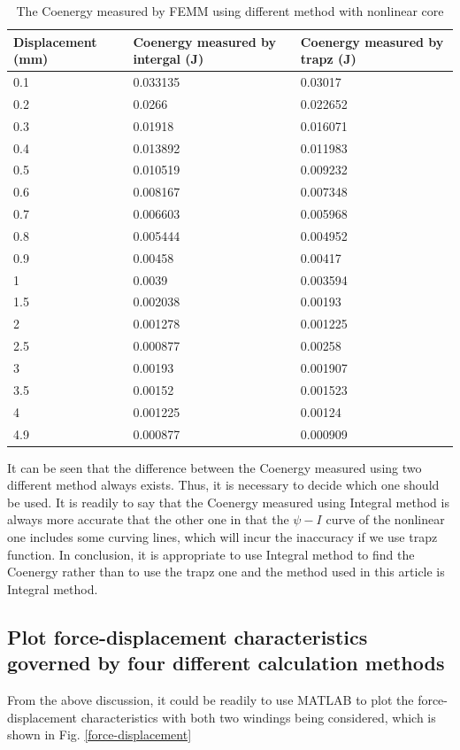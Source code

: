 \documentclass[a4paper]{IEEEtran}
\begin{document}
{\begin{table}[h!]
\centering
\begin{tabular}{|p{2.5cm}p{2.5cm}p{2.5cm}|} 
	\hline
	Displacement (mm) & Coenergy measured by intergal (J)& Coenergy measured by trapz (J)\\  
	\hline\hline
	0.1	& 0.033135 & 0.03017\\
	\hline
	0.2	& 0.0266 &0.022652\\
	\hline
	0.3	& 0.01918 & 0.016071\\
	\hline
	0.4	& 0.013892 & 0.011983\\
	\hline
	0.5	& 0.010519 & 0.009232\\
	\hline
	0.6	& 0.008167 & 0.007348\\
	\hline
	0.7	& 0.006603 & 0.005968\\
	\hline
	0.8	& 0.005444 & 0.004952\\
	\hline
	0.9	& 0.00458 & 0.00417\\
	\hline
	1 & 0.0039 & 0.003594\\
	\hline
	1.5 & 0.002038 & 0.00193\\
	\hline
	2 & 0.001278 & 0.001225\\
	\hline
	2.5 & 0.000877 & 0.00258\\
	\hline
	3 & 0.00193 & 0.001907\\
	\hline
	3.5 & 0.00152 & 0.001523\\
	\hline
	4 & 0.001225 & 0.00124\\
	\hline
	4.9 & 0.000877 & 0.000909\\
	\hline
\end{tabular}
\caption{The Coenergy measured by FEMM using different method with nonlinear core}
\label{table:1}
\end{table}
It can be seen that the difference between the Coenergy measured using two different method always
exists. Thus, it is necessary to decide which one should be used. It is readily to say that the Coenergy
measured using Integral method is always more accurate that the other one in that the $\psi-I$ curve of 
the nonlinear one includes some curving lines, which will incur the inaccuracy if we use trapz function.
In conclusion, it is appropriate to use Integral method to find the Coenergy rather than to use the trapz one
and the method used in this article is Integral method.

\subsection{Plot force-displacement characteristics governed by four different calculation methods}
From the above discussion, it could be readily to use MATLAB to plot the force-displacement characteristics with both two windings being considered,
which is shown in Fig. \ref{force-displacement}

}
\end{document}
